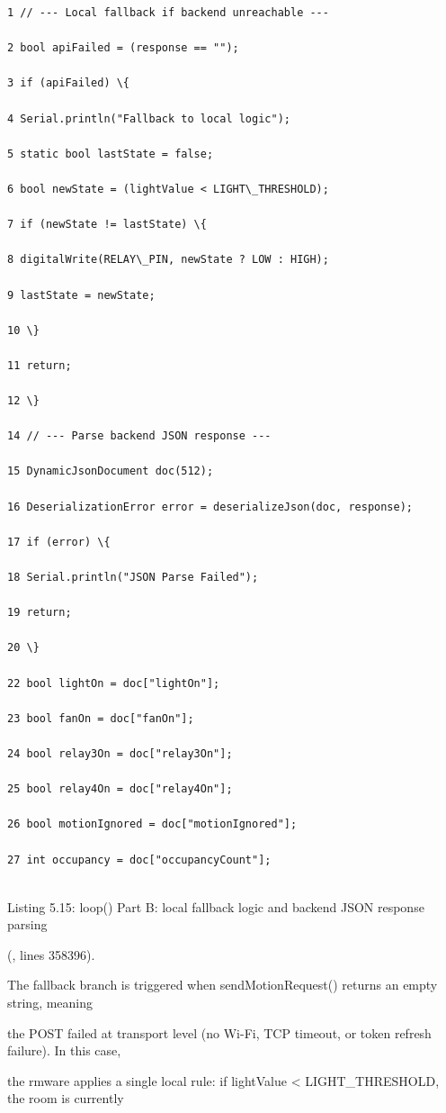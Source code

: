 \begin{listingbox}
	\begin{verbatim}
1 // --- Local fallback if backend unreachable ---

2 bool apiFailed = (response == "");

3 if (apiFailed) \{

4 Serial.println("Fallback to local logic");

5 static bool lastState = false;

6 bool newState = (lightValue < LIGHT\_THRESHOLD);

7 if (newState != lastState) \{

8 digitalWrite(RELAY\_PIN, newState ? LOW : HIGH);

9 lastState = newState;

10 \}

11 return;

12 \}

14 // --- Parse backend JSON response ---

15 DynamicJsonDocument doc(512);

16 DeserializationError error = deserializeJson(doc, response);

17 if (error) \{

18 Serial.println("JSON Parse Failed");

19 return;

20 \}

22 bool lightOn = doc["lightOn"];

23 bool fanOn = doc["fanOn"];

24 bool relay3On = doc["relay3On"];

25 bool relay4On = doc["relay4On"];

26 bool motionIgnored = doc["motionIgnored"];

27 int occupancy = doc["occupancyCount"];


\end{verbatim}
\end{listingbox}
Listing 5.15: loop() Part B: local fallback logic and backend JSON response parsing

(, lines 358396).

The fallback branch is triggered when sendMotionRequest() returns an empty string, meaning

the POST failed at transport level (no Wi-Fi, TCP timeout, or token refresh failure). In this case,

the rmware applies a single local rule: if lightValue < LIGHT\_THRESHOLD, the room is currently

